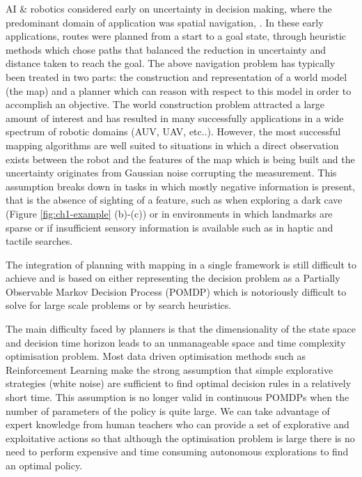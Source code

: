 AI \& robotics considered early on uncertainty in decision making, where the predominant domain of application 
was spatial navigation, \cite{acting_uncer_1996}. In these early applications, routes were planned 
from a start to a goal state, through heuristic methods which chose paths that balanced the reduction in uncertainty and 
distance taken to reach the goal. The above navigation problem has typically been treated in two parts:
the construction and representation of a world model (the map) and a planner which can reason with respect 
to this model in order to accomplish an objective. The world construction problem attracted a large amount of 
interest and has resulted in many successfully applications in a wide spectrum of robotic domains (AUV, UAV, etc..). 
However, the most successful mapping algorithms are well suited to situations in which a direct observation exists between the 
robot and the features of the map which is being built and the uncertainty originates from Gaussian noise corrupting the measurement. 
This assumption breaks down in tasks in which mostly negative information is present, that is the absence of sighting of a feature,
such as when exploring a dark cave (Figure \ref{fig:ch1-example} (b)-(c)) or in environments in which landmarks are sparse or if 
insufficient sensory information is available such as in haptic and tactile searches.

The integration of planning with mapping in a single framework is still difficult to achieve and is based on either 
representing the decision problem as a Partially Observable Markov Decision Process (POMDP) which is notoriously difficult 
to solve for large scale problems or by search heuristics.  

The main difficulty faced by planners is that the dimensionality of the state space and decision time horizon leads 
to an unmanageable space and time complexity optimisation problem. Most data driven optimisation methods such as 
Reinforcement Learning make the strong assumption that simple explorative strategies (white noise) are sufficient 
to find optimal decision rules in a relatively short time. This assumption is no longer valid in continuous POMDPs 
when the number of parameters of the policy is quite large. We can take advantage of expert knowledge from 
human teachers who can provide a set of explorative and exploitative actions so that although the optimisation 
problem is large there is no need to perform expensive and time consuming autonomous explorations to find an optimal policy. 


